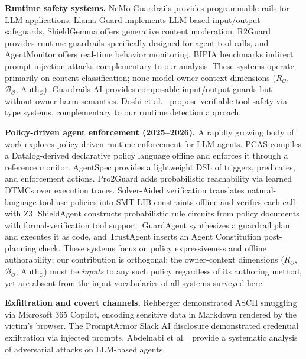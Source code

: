 \documentclass[conference]{IEEEtran}
\theoremstyle{definition}
\newcommand{\BO}{\mathcal{B}_{\mathcal{O}}}
\newcommand{\RO}{R_{\mathcal{O}}}
\newcommand{\AuthO}{\text{Auth}_{\mathcal{O}}}
\begin{document}
\textbf{Runtime safety systems.} NeMo Guardrails \cite{rebedea2023nemoguardrails}
provides programmable rails for LLM applications. Llama Guard
\cite{inan2023llamaguard} implements LLM-based input/output safeguards.
ShieldGemma \cite{zeng2024shieldgemma} offers generative content moderation.
R2Guard \cite{chen2024r2guard} provides runtime guardrails specifically
designed for agent tool calls, and AgentMonitor \cite{yu2024agentmonitor}
offers real-time behavior monitoring. BIPIA \cite{yi2023bipia} benchmarks
indirect prompt injection attacks complementary to our analysis.
These systems operate primarily on content classification; none model
owner-context dimensions ($\RO$, $\BO$, $\AuthO$). Guardrails AI
\cite{guardrailsai2024} provides composable input/output guards but without
owner-harm semantics. Doshi et al.\ \cite{doshi2026verifiable} propose
verifiable tool safety via type systems, complementary to our runtime
detection approach.

\textbf{Policy-driven agent enforcement (2025--2026).} A rapidly growing
body of work explores policy-driven runtime enforcement for LLM agents.
PCAS \cite{palumbo2026pcas} compiles a Datalog-derived declarative
policy language offline and enforces it through a reference monitor.
AgentSpec \cite{wang2026agentspec} provides a lightweight DSL of
triggers, predicates, and enforcement actions. Pro2Guard
\cite{he2025pro2guard} adds probabilistic reachability via learned
DTMCs over execution traces. Solver-Aided verification
\cite{roy2026solveraided} translates natural-language tool-use policies
into SMT-LIB constraints offline and verifies each call with Z3.
ShieldAgent \cite{chen2025shieldagent} constructs probabilistic rule
circuits from policy documents with formal-verification tool support.
GuardAgent \cite{xiang2024guardagent} synthesizes a guardrail plan and
executes it as code, and TrustAgent \cite{hua2024trustagent} inserts
an Agent Constitution post-planning check. These systems focus on
policy expressiveness and offline authorability; our contribution is
orthogonal: the owner-context dimensions ($\RO$, $\BO$, $\AuthO$) must
be \emph{inputs} to any such policy regardless of its authoring method,
yet are absent from the input vocabularies of all systems surveyed here.

\textbf{Exfiltration and covert channels.} Rehberger \cite{rehberger2024copilot}
demonstrated ASCII smuggling via Microsoft 365 Copilot, encoding sensitive
data in Markdown rendered by the victim's browser. The PromptArmor Slack
AI disclosure \cite{promptarmor2024slack} demonstrated credential
exfiltration via injected prompts. Abdelnabi et al.\ \cite{abdelnabi2024llmagent}
provide a systematic analysis of adversarial attacks on LLM-based agents.
\end{document}
